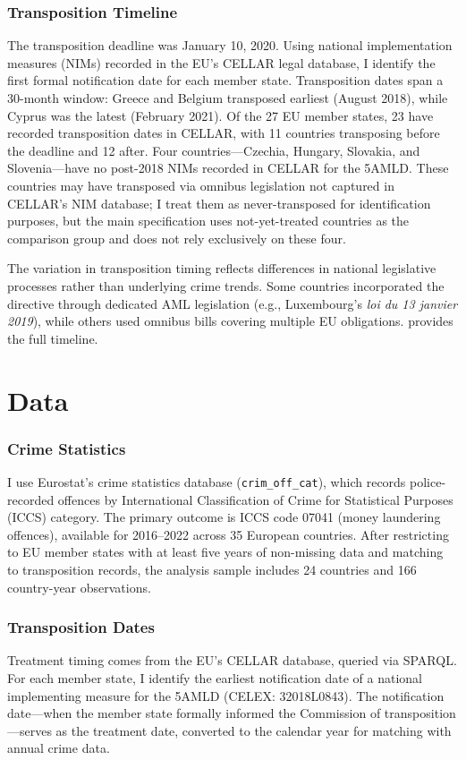 \documentclass[12pt]{article}
\begin{document}
\subsubsection*{Transposition Timeline}
The transposition deadline was January 10, 2020. Using national implementation measures (NIMs) recorded in the EU's CELLAR legal database, I identify the first formal notification date for each member state. Transposition dates span a 30-month window: Greece and Belgium transposed earliest (August 2018), while Cyprus was the latest (February 2021). Of the 27 EU member states, 23 have recorded transposition dates in CELLAR, with 11 countries transposing before the deadline and 12 after. Four countries---Czechia, Hungary, Slovakia, and Slovenia---have no post-2018 NIMs recorded in CELLAR for the 5AMLD. These countries may have transposed via omnibus legislation not captured in CELLAR's NIM database; I treat them as never-transposed for identification purposes, but the main specification uses not-yet-treated countries as the comparison group and does not rely exclusively on these four.

The variation in transposition timing reflects differences in national legislative processes rather than underlying crime trends. Some countries incorporated the directive through dedicated AML legislation (e.g., Luxembourg's \textit{loi du 13 janvier 2019}), while others used omnibus bills covering multiple EU obligations.  provides the full timeline.

\section{Data}
\label{sec:data}

\subsubsection*{Crime Statistics}
I use Eurostat's crime statistics database (\texttt{crim\_off\_cat}), which records police-recorded offences by International Classification of Crime for Statistical Purposes (ICCS) category. The primary outcome is ICCS code 07041 (money laundering offences), available for 2016--2022 across 35 European countries. After restricting to EU member states with at least five years of non-missing data and matching to transposition records, the analysis sample includes 24 countries and 166 country-year observations.

\subsubsection*{Transposition Dates}
Treatment timing comes from the EU's CELLAR database, queried via SPARQL. For each member state, I identify the earliest notification date of a national implementing measure for the 5AMLD (CELEX: 32018L0843). The notification date---when the member state formally informed the Commission of transposition---serves as the treatment date, converted to the calendar year for matching with annual crime data.
\end{document}

